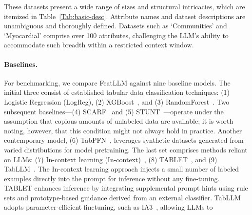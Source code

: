 These datasets present a wide range of sizes and structural intricacies, which are itemized in Table~\ref{Tab:basic-desc}. Attribute names and dataset descriptions are unambiguous and thoroughly defined. Datasets such as `Communities' and `Myocardial' comprise over 100 attributes, challenging the LLM's ability to accommodate such breadth within a restricted context window.

\vspace*{-0.12in}
\paragraph{Baselines.}
For benchmarking, we compare \textsf{FeatLLM} against nine baseline models. The initial three consist of established tabular data classification techniques: (1) Logistic Regression (LogReg), (2) XGBoost~\cite{chen2016xgboost}, and (3) RandomForest~\cite{ho1995random}. Two subsequent baselines—(4) SCARF~\cite{bahri2022scarf} and (5) STUNT~\cite{nam2023stunt}—operate under the assumption that copious amounts of unlabeled data are available; it is worth noting, however, that this condition might not always hold in practice. Another contemporary model, (6) TabPFN~\cite{hollmann2022tabpfn}, leverages synthetic datasets generated from varied distributions for model pretraining. The last set comprises methods reliant on LLMs: (7) In-context learning (In-context)~\cite{wei2022emergent}, (8) TABLET~\cite{slack2023tablet}, and (9) TabLLM~\cite{hegselmann2023tabllm}. The In-context learning approach injects a small number of labeled examples directly into the prompt for inference without any fine-tuning. TABLET enhances inference by integrating supplemental prompt hints using rule sets and prototype-based guidance derived from an external classifier. TabLLM adopts parameter-efficient finetuning, such as IA3~\cite{liu2022few}, allowing LLMs to

\vspace*{-0.12in}
